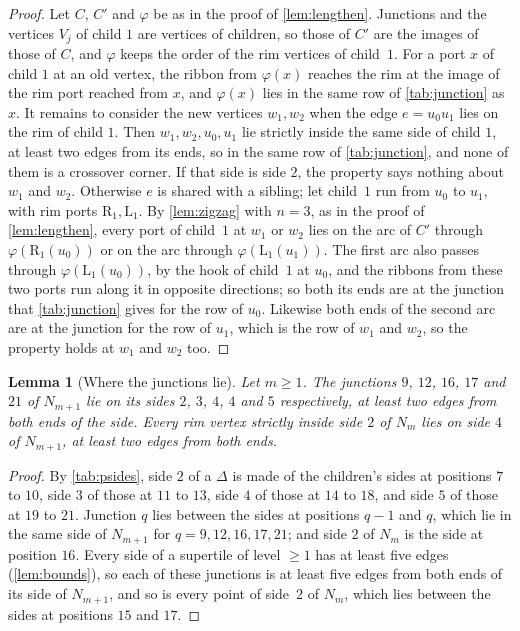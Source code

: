 \documentclass[11pt]{amsart}
\newtheorem{lemma}[theorem]{Lemma}
\theoremstyle{definition}
\theoremstyle{remark}
\newcommand{\Lp}{\mathrm L}
\newcommand{\Rp}{\mathrm R}
\begin{document}
\begin{proof}
Let $C$, $C'$ and $\varphi$ be as in the proof of \cref{lem:lengthen}. Junctions and the vertices $V_j$ of child $1$ are
vertices of children, so those of $C'$ are the images of those of $C$, and $\varphi$ keeps the order of the rim vertices
of child~$1$. For a port $x$ of child $1$ at an old vertex, the ribbon from $\varphi(x)$ reaches the rim at the image
of the rim port reached from $x$, and $\varphi(x)$ lies in the same row of \cref{tab:junction} as $x$. It remains to
consider the new vertices $w_1,w_2$ when the edge $e=u_0u_1$ lies on the rim of child $1$. Then $w_1,w_2,u_0,u_1$ lie
strictly inside the same side of child $1$, at least two edges from its ends, so in the same row of
\cref{tab:junction}, and none of them is a crossover corner. If that side is side $2$, the property says nothing about
$w_1$ and $w_2$. Otherwise $e$ is shared with a sibling; let child~$1$ run from $u_0$ to $u_1$, with rim ports
$\Rp_1,\Lp_1$. By \cref{lem:zigzag} with $n=3$, as in the proof of \cref{lem:lengthen}, every port of child~$1$ at
$w_1$ or $w_2$ lies on the arc of $C'$ through $\varphi(\Rp_1(u_0))$ or on the arc through $\varphi(\Lp_1(u_1))$. The
first arc also passes through $\varphi(\Lp_1(u_0))$, by the hook of child~$1$ at $u_0$, and the ribbons from these two
ports run along it in opposite directions; so both its ends are at the junction that \cref{tab:junction} gives for the
row of $u_0$. Likewise both ends of the second arc are at the junction for the row of $u_1$, which is the row of $w_1$
and $w_2$, so the property holds at $w_1$ and $w_2$ too.
\end{proof}

\begin{lemma}[Where the junctions lie]\label{lem:junctions}
Let $m\ge1$. The junctions $9$, $12$, $16$, $17$ and $21$ of $N_{m+1}$ lie on its sides $2$, $3$, $4$, $4$ and $5$
respectively, at least two edges from both ends of the side. Every rim vertex strictly inside side $2$ of $N_m$ lies on
side $4$ of $N_{m+1}$, at least two edges from both ends.
\end{lemma}

\begin{proof}
By \cref{tab:psides}, side $2$ of a $\Delta$ is made of the children's sides at positions $7$ to $10$, side $3$ of
those at $11$ to $13$, side $4$ of those at $14$ to $18$, and side $5$ of those at $19$ to $21$. Junction $q$ lies
between the sides at positions $q-1$ and $q$, which lie in the same side of $N_{m+1}$ for $q=9,12,16,17,21$; and side $2$
of $N_m$ is the side at position $16$. Every side of a supertile of level $\ge1$ has at least five edges
(\cref{lem:bounds}), so each of these junctions is at least five edges from both ends of its side of $N_{m+1}$, and so
is every point of side~$2$ of $N_m$, which lies between the sides at positions $15$ and $17$.
\end{proof}
\end{document}
